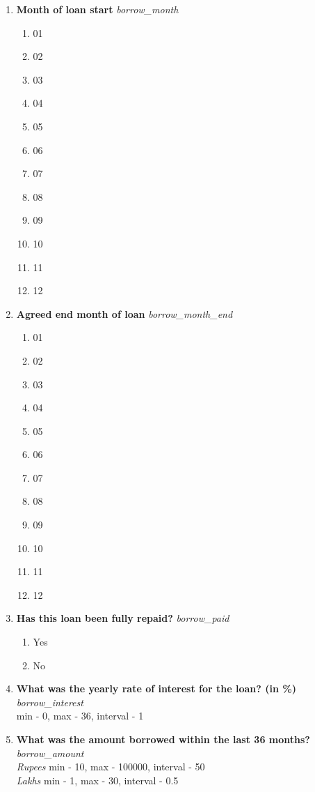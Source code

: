 \documentclass{article}
\begin{document}
\begin{enumerate}
\begin{enumerate}[label*=\arabic*.]
\item {\bfseries Month of loan start}\emph{ borrow\_month } 
\begin{enumerate} 
\item 01 
\item 02 
\item 03 
\item 04 
\item 05 
\item 06 
\item 07 
\item 08 
\item 09 
\item 10 
\item 11 
\item 12 
\end{enumerate} 

\item {\bfseries Agreed end month of loan}\emph{ borrow\_month\_end } 
\begin{enumerate} 
\item 01 
\item 02 
\item 03 
\item 04 
\item 05 
\item 06 
\item 07 
\item 08 
\item 09 
\item 10 
\item 11 
\item 12 
\end{enumerate} 

\item {\bfseries Has this loan been fully repaid?}\emph{ borrow\_paid } 
\begin{enumerate} 
\item Yes 
\item No 
\end{enumerate} 

\item {\bfseries What was the yearly rate of interest for the loan? (in \%)}\emph{ borrow\_interest } 
\\min - 0, max - 36, interval - 1 
 
\item {\bfseries What was the amount borrowed within the last 36 months?}\emph{ borrow\_amount } 
\\ \emph{ Rupees }min - 10, max - 100000, interval - 50 
\\ \emph{ Lakhs }min - 1, max - 30, interval - 0.5 
 

\end{enumerate}
\end{enumerate}
\end{document}
